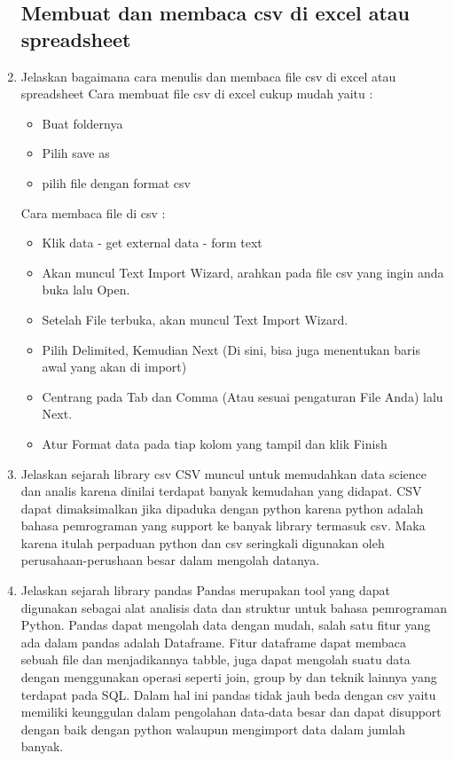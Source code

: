 \begin{enumerate}
\subsection{Membuat dan membaca csv di excel atau spreadsheet}

\item Jelaskan bagaimana cara menulis dan membaca file csv di excel atau spreadsheet
 Cara membuat file csv di excel cukup mudah yaitu :
\begin{itemize}
	\item Buat foldernya
	\item Pilih save as
	\item pilih file dengan format csv
\end{itemize}
Cara membaca file di csv :
\begin{itemize}
	\item Klik data - get external data - form text
	\item Akan muncul Text Import Wizard, arahkan pada file csv yang ingin anda buka lalu Open.
	\item Setelah File terbuka, akan muncul Text Import Wizard.
	\item Pilih Delimited, Kemudian Next (Di sini, bisa juga menentukan baris awal yang akan di import)
	\item Centrang pada Tab dan Comma (Atau sesuai pengaturan File Anda) lalu Next.
	\item Atur Format data pada tiap kolom yang tampil dan klik Finish
\end{itemize}

\item Jelaskan sejarah library csv
 CSV muncul untuk memudahkan data science dan analis karena dinilai terdapat banyak kemudahan yang didapat. CSV dapat dimaksimalkan jika dipaduka dengan python karena python adalah bahasa pemrograman yang support ke banyak library termasuk csv. Maka karena itulah perpaduan python dan csv seringkali digunakan oleh perusahaan-perushaan besar dalam mengolah datanya.

\item Jelaskan sejarah library pandas
 Pandas merupakan tool yang dapat digunakan sebagai alat analisis data dan struktur untuk bahasa pemrograman Python. Pandas dapat mengolah data dengan mudah, salah satu fitur yang ada dalam pandas adalah Dataframe. Fitur dataframe dapat membaca sebuah file dan menjadikannya tabble, juga dapat mengolah suatu data dengan menggunakan operasi seperti join, group by dan teknik lainnya yang terdapat pada SQL. Dalam hal ini pandas tidak jauh beda dengan csv yaitu memiliki keunggulan dalam pengolahan data-data besar dan dapat disupport dengan baik dengan python walaupun mengimport data dalam jumlah banyak.


\end{enumerate}
